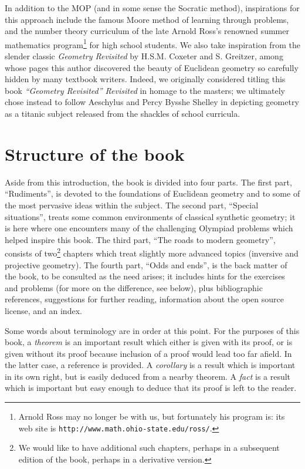 \documentclass[12pt]{book}
\numberwithin{exc}{section}
\numberwithin{figure}{section}
\numberwithin{equation}{theorem}
\begin{document}
In addition to the MOP (and in some sense the Socratic method), 
inspirations for this approach include the
famous Moore method  of learning through problems, 
and the number theory curriculum of the late Arnold Ross's 
 renowned
summer mathematics program\footnote{Arnold Ross 
may no longer be with us, but 
fortunately his program is: its web site is
\texttt{http://www.math.ohio-state.edu/ross/}.} for high school students.
We also take inspiration from the slender classic 
\emph{Geometry Revisited} by H.S.M. Coxeter 
and S. Greitzer, 
among whose pages this author discovered the beauty of Euclidean
geometry so carefully hidden by many textbook writers. Indeed,
we originally considered titling this book \textit{``Geometry Revisited''
Revisited} in homage to the masters; we ultimately chose instead to
follow Aeschylus 
and Percy Bysshe Shelley 
in depicting geometry as a titanic subject
released from the shackles of school curricula.

\section{Structure of the book}

Aside from this introduction, the book is divided into four parts.
The first part, ``Rudiments'', is devoted to the foundations of Euclidean geometry
and to some of the most pervasive ideas within the subject.
The second part, ``Special situations'', treats some common environments of
classical synthetic geometry; it is here where one encounters many of
the challenging Olympiad problems which helped inspire this book.
The third part, ``The roads to modern geometry'', consists of two\footnote{We
would like to have additional such chapters, perhaps in a subsequent
edition of the book, perhaps in a derivative version.} chapters
which treat slightly more advanced topics (inversive and projective geometry).
The fourth part, ``Odds and ends'', 
is the back matter of the book, to be consulted
as the need arises; it includes hints for the exercises
and problems (for more on the difference, see below),
plus bibliographic references, suggestions for further reading, 
information about the open source license, and an index.

Some words about terminology 
are in order at this point. 
For the purposes of this book, a \emph{theorem} 
 is an important result 
which either is given with its proof, or is given without its proof
because inclusion of a proof would lead too far afield. In the 
latter case, a reference is provided. 
A \emph{corollary}  is a result which is 
important in its own right, but is easily deduced from a nearby theorem.
A \emph{fact}  is a result which is
important but easy enough to deduce that its proof is left to the reader.
\end{document}
